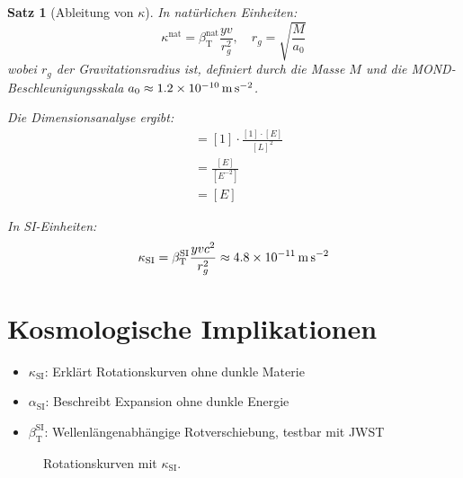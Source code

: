 \documentclass[12pt,a4paper]{article}
\newcommand{\betaT}{\beta_{\text{T}}}
\newtheorem{theorem}{Satz}[section]
\begin{document}
	\begin{theorem}[Ableitung von \(\kappa\)]
		In natürlichen Einheiten:
		\begin{equation}
			\kappa^{\text{nat}} = \betaT^{\text{nat}} \frac{y v}{r_g^2}, \quad r_g = \sqrt{\frac{M}{a_0}}
		\end{equation}
		wobei \(r_g\) der Gravitationsradius ist, definiert durch die Masse \(M\) und die MOND-Beschleunigungsskala \(a_0 \approx \SI{1{,}2e-10}{\meter\per\second\squared}\).
		
		Die Dimensionsanalyse ergibt:
		\begin{align}
			[\kappa^{\text{nat}}] &= [1] \cdot \frac{[1] \cdot [E]}{[L]^2} \\
			&= \frac{[E]}{[E^{-2}]} \\
			&= [E]
		\end{align}
		
		In SI-Einheiten:
		\begin{equation}
			\kappa_{\text{SI}} = \betaT^{\text{SI}} \frac{y v c^2}{r_g^2} \approx \SI{4{,}8e-11}{\meter\per\second\squared}
		\end{equation}
	\end{theorem}
	
	
	\section{Kosmologische Implikationen}
	
	\begin{itemize}
		\item \(\kappa_{\text{SI}}\): Erklärt Rotationskurven ohne dunkle Materie
		\item \(\alpha_{\text{SI}}\): Beschreibt Expansion ohne dunkle Energie
		\item \(\betaT^{\text{SI}}\): Wellenlängenabhängige Rotverschiebung, testbar mit JWST
	\end{itemize}
	
	\begin{figure}[h]
		\centering
		\caption{Rotationskurven mit \(\kappa_{\text{SI}}\).}
	\end{figure}
	
\end{document}
